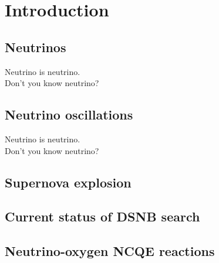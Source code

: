 
%
%

\section{Introduction}\label{Section_001}

\subsection{Neutrinos}
\vs\hs Neutrino is neutrino.\\
Don't you know neutrino?

\subsection{Neutrino oscillations}
\vs\hs Neutrino is neutrino.\\
Don't you know neutrino?

\subsection{Supernova explosion}

\subsection{Current status of DSNB search}

\subsection{Neutrino-oxygen NCQE reactions}

\newpage
